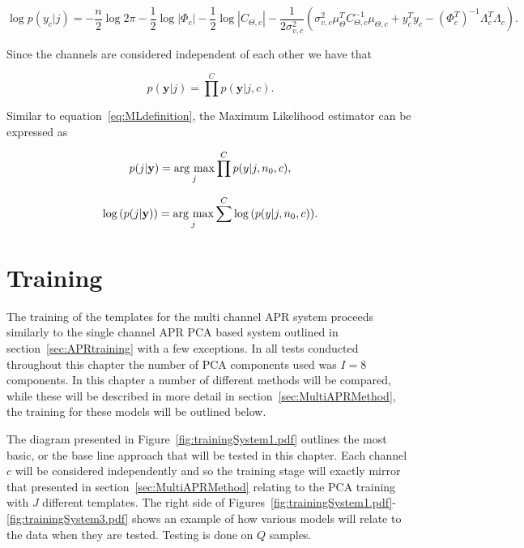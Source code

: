 \begin{equation}\label{eq:loglikeli_c}
\log{p(y_c|j)} = - \frac{n}{2}\log{2 \pi}- \frac{1}{2}\log{|\Phi_c|} - \frac{1}{2}\log{|C_{\Theta,c}|} - \frac{1}{2\sigma^2_{v,c}}\left(\sigma_{v,c}^2\mu_\Theta^TC_{\Theta,c}^{-1}\mu_{\Theta,c} + y_c^Ty_c- \left(\Phi_c^T\right)^{-1}\Lambda_c^T\Lambda_c\right).
\end{equation}

Since the channels are considered independent of each other we have that

\begin{equation}\label{eq:jointprob_c}
p(\textbf{y} | j) = \prod^C p(\textbf{y} | j, c).
\end{equation}

Similar to equation~\ref{eq:MLdefinition}, the Maximum Likelihood estimator can be expressed as

\begin{equation}\label{eq:MLdefinition_c}
p(j |\textbf{y}) = \underset{j}{\mathrm{arg~max}} \prod^C p(y|j,n_0,c),
\end{equation}

\begin{equation}\label{eq:MLdefinition2_c}
\log{\left( p(j |\textbf{y})\right)} = \underset{j}{\mathrm{arg~max}} \sum^C \log{\left( p(y|j,n_0,c) \right)}.
\end{equation}

\section{Training}\label{sec:MultiAPRTraining}
The training of the templates for the multi channel APR system proceeds similarly to the single channel APR PCA based system outlined in section~\ref{sec:APRtraining} with a few exceptions. In all tests conducted throughout this chapter the number of PCA components used was $I = 8$ components. In this chapter a number of different methods will be compared, while these will be described in more detail in section~\ref{sec:MultiAPRMethod}, the training for these models will be outlined below.

The diagram presented in Figure~\ref{fig:trainingSystem1.pdf} outlines the most basic, or the base line approach that will be tested in this chapter. Each channel $c$ will be considered independently and so the training stage will exactly mirror that presented in section~\ref{sec:MultiAPRMethod} relating to the PCA training with $J$ different templates. The right side of Figures~\ref{fig:trainingSystem1.pdf}-\ref{fig:trainingSystem3.pdf} shows an example of how various models will relate to the data when they are tested. Testing is done on $Q$ samples.

